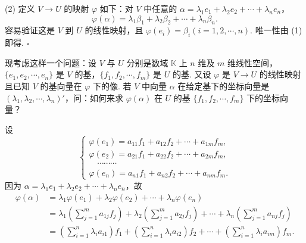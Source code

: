 \documentclass[UTF8, 12pt, fontset=fandol, oneside]{ctexart}
\begin{document}
(2) 定义 $V\to U$ 的映射 $\varphi$ 如下：对 $V$ 中任意的 $\alpha=\lambda_1e_1+\lambda_2e_2+\cdots+\lambda_ne_n$，
\[
\varphi(\alpha)=\lambda_1\beta_1+\lambda_2\beta_2+\cdots+\lambda_n\beta_n.
\]
容易验证这是 $V$ 到 $U$ 的线性映射，且 $\varphi(e_i)=\beta_i(i=1,2,\cdots,n)$. 唯一性由 (1) 即得. $\square$

现考虑这样一个问题：设 $V$ 与 $U$ 分别是数域 $\mathbb{K}$ 上 $n$ 维及 $m$ 维线性空间，$\{e_1,e_2,\cdots,e_n\}$ 是 $V$ 的基，$\{f_1,f_2,\cdots,f_m\}$ 是 $U$ 的基. 又设 $\varphi$ 是 $V\to U$ 的线性映射且已知 $V$ 的基向量在 $\varphi$ 下的像. 若 $V$ 中向量 $\alpha$ 在给定基下的坐标向量是 $(\lambda_1,\lambda_2,\cdots,\lambda_n)'$，问：如何来求 $\varphi(\alpha)$ 在 $U$ 的基 $\{f_1,f_2,\cdots,f_m\}$ 下的坐标向量？

设
\begin{equation}
\left\{
\begin{array}{l}
\varphi(e_1)=a_{11}f_1+a_{12}f_2+\cdots+a_{1m}f_m,\\
\varphi(e_2)=a_{21}f_1+a_{22}f_2+\cdots+a_{2m}f_m,\\
\quad\cdots\cdots\cdots\\
\varphi(e_n)=a_{n1}f_1+a_{n2}f_2+\cdots+a_{nm}f_m.
\end{array}\right.
\tag{4.3.1}
\end{equation}
因为 $\alpha=\lambda_1e_1+\lambda_2e_2+\cdots+\lambda_ne_n$，故
\[
\begin{aligned}
\varphi(\alpha)
&=\lambda_1\varphi(e_1)+\lambda_2\varphi(e_2)+\cdots+\lambda_n\varphi(e_n)\\
&=\lambda_1\left(\sum_{j=1}^m a_{1j}f_j\right)+\lambda_2\left(\sum_{j=1}^m a_{2j}f_j\right)+\cdots+\lambda_n\left(\sum_{j=1}^m a_{nj}f_j\right)\\
&=\left(\sum_{i=1}^n\lambda_i a_{i1}\right)f_1+\left(\sum_{i=1}^n\lambda_i a_{i2}\right)f_2+\cdots+\left(\sum_{i=1}^n\lambda_i a_{im}\right)f_m.
\end{aligned}
\]
\end{document}
